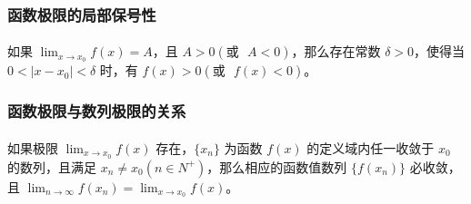 \subsubsection{函数极限的局部保号性}
\paragraph{}
如果 $\displaystyle{\lim_{x \to x_0}}f(x) = A$，且 $A > 0 (\text{或~~} A < 0)$，那么存在常数 $\delta > 0$，使得当 $0 < |x - x_0| < \delta$ 时，有 $f(x) > 0 (\text{或~~} f(x) < 0)$。

\subsubsection{函数极限与数列极限的关系}
\paragraph{}
如果极限 $\displaystyle{\lim_{x \to x_0}}f(x)$ 存在，$\{x_n\}$ 为函数 $f(x)$ 的定义域内任一收敛于 $x_0$ 的数列，且满足 $x_n \neq x_0(n \in N^+)$，那么相应的函数值数列 $\{f(x_n)\}$ 必收敛，且 $\displaystyle{\lim_{n \to \infty}f(x_n) = \lim_{x \to x_0}f(x)}$。
